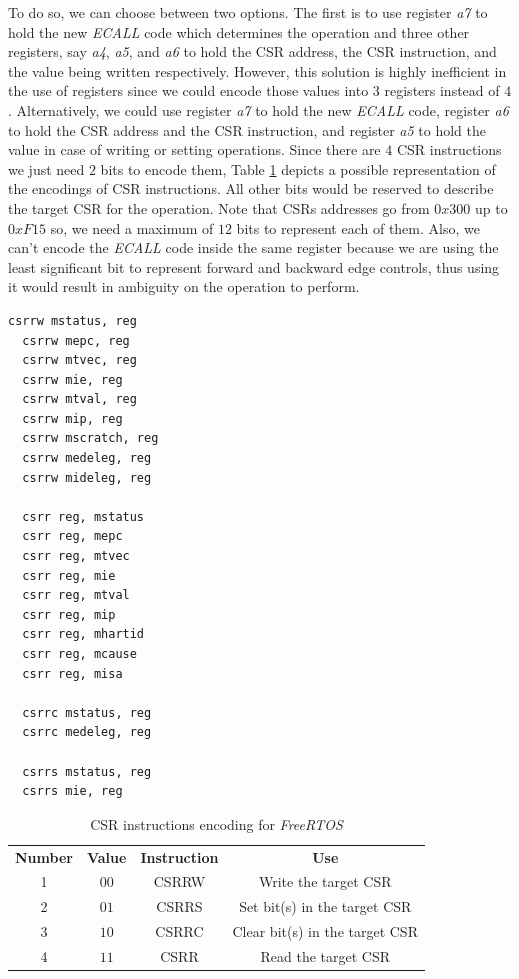 To do so, we can choose between two options. The first is to use register
\textit{a7} to hold the new \textit{ECALL} code which determines the operation
and three other registers, say \textit{a4}, \textit{a5}, and \textit{a6} to hold
the CSR address, the CSR instruction, and the value being written respectively. However,
this solution is highly inefficient in the use of registers since we could
encode those values into $3$ registers instead of $4$. Alternatively, we could
use register \textit{a7} to hold the new \textit{ECALL} code, register \textit{a6}
to hold the CSR address and the CSR instruction, and register \textit{a5} to
hold the value in case of writing or setting operations. Since there are $4$ CSR
instructions we just need $2$ bits to encode them, Table
\ref{tab:instructionenc} depicts a possible representation of the encodings of
CSR instructions. All other bits would be reserved to describe the target CSR for
the operation. Note that CSRs addresses go from $0x30 0$ up to $0xF15$ so, we need
a maximum of $12$ bits to represent each of them. Also, we can't encode the \textit{ECALL}
code inside the same register because we are using the least significant bit to
represent forward and backward edge controls, thus using it would result in ambiguity
on the operation to perform. \\
\begin{lstlisting}[style=Assembly, caption = \textit{FreeRTOS} operations on Control and Status Registers, label={lst:freeoperations}]
  csrrw mstatus, reg
  csrrw mepc, reg
  csrrw mtvec, reg
  csrrw mie, reg
  csrrw mtval, reg
  csrrw mip, reg
  csrrw mscratch, reg
  csrrw medeleg, reg
  csrrw mideleg, reg

  csrr reg, mstatus
  csrr reg, mepc
  csrr reg, mtvec
  csrr reg, mie
  csrr reg, mtval
  csrr reg, mip
  csrr reg, mhartid
  csrr reg, mcause
  csrr reg, misa

  csrrc mstatus, reg
  csrrc medeleg, reg

  csrrs mstatus, reg
  csrrs mie, reg
\end{lstlisting}

\begin{table}
  \centering
  \begin{tabular}{|c|c|c|c|}
    \hline
    \textbf{Number} & \textbf{Value} & \textbf{Instruction} & \textbf{Use}                   \\
    \hhline{====} 1 & $00$           & CSRRW                & Write the target CSR           \\
    \hline
    2               & $01$           & CSRRS                & Set bit(s) in the target CSR   \\
    \hline
    3               & $10$           & CSRRC                & Clear bit(s) in the target CSR \\
    \hline
    4               & $11$           & CSRR                 & Read the target CSR            \\
    \hline
  \end{tabular}
  \caption{CSR instructions encoding for \textit{FreeRTOS}}
  \label{tab:instructionenc}
\end{table}

